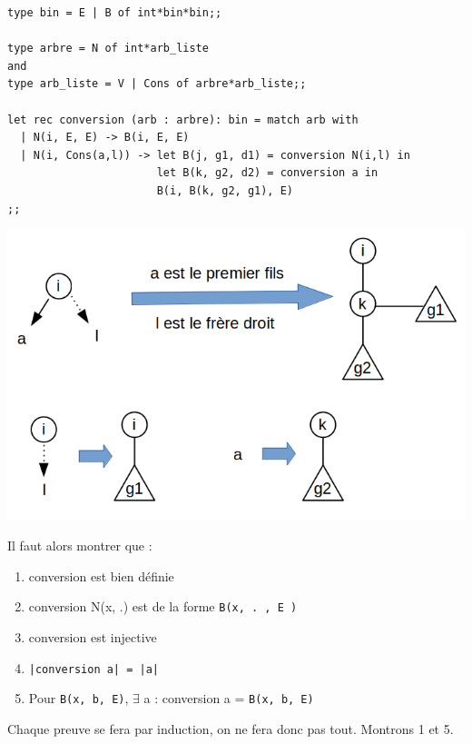 \begin{lstlisting}
type bin = E | B of int*bin*bin;;

type arbre = N of int*arb_liste 
and
type arb_liste = V | Cons of arbre*arb_liste;;

let rec conversion (arb : arbre): bin = match arb with
  | N(i, E, E) -> B(i, E, E)
  | N(i, Cons(a,l)) -> let B(j, g1, d1) = conversion N(i,l) in
                       let B(k, g2, d2) = conversion a in
                       B(i, B(k, g2, g1), E)
;;
\end{lstlisting}

\begin{center}
	\includegraphics[scale=0.4]{Developpements/Correspondance arbres binaires et généraux/transf_gen_a_bin.png}
\end{center}
Il faut alors montrer que : \begin{enumerate}
	\item conversion est bien définie
	\item conversion N(x, .) est de la forme \lstinline|B(x, . , E )|
	\item conversion est injective
	\item \lstinline{|conversion a| = |a|}
	\item Pour \lstinline|B(x, b, E)|, $\exists$ a : conversion a = \lstinline|B(x, b, E)|
	
\end{enumerate}

Chaque preuve se fera par induction, on ne fera donc pas tout. Montrons 1 et 5. \newline

